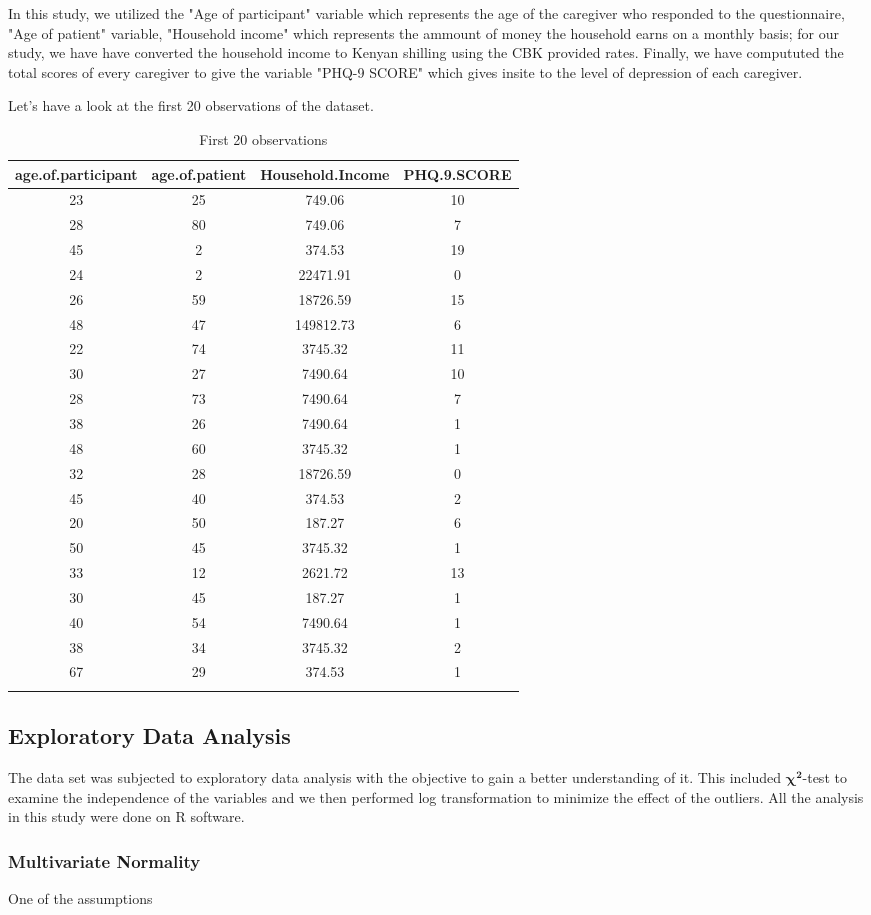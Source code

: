 \documentclass[12pt]{article}
\numberwithin{equation}{section}
\numberwithin{table}{section}
\begin{document}
\noindent In this study, we utilized the "Age of participant" variable which represents the age of the caregiver who responded to the questionnaire, "Age of patient" variable, "Household income" which represents the ammount of money the household earns on a monthly basis; for our study, we have have converted the household income to Kenyan shilling using the CBK provided rates. Finally, we have  compututed the total scores of every caregiver to give the variable "PHQ-9 SCORE" which gives insite to the level of depression of each caregiver.

\noindent Let's have a look at the first 20 observations of the dataset.
		\begin{longtable}[t]{|c|c|c|c|}
	\hline
	age.of.participant & age.of.patient & Household.Income & PHQ.9.SCORE\\
	\hline
	23 & 25 & 749.06 & 10\\
	28 & 80 & 749.06 & 7\\
	45 & 2 & 374.53 & 19\\
	24 & 2 & 22471.91 & 0\\
	26 & 59 & 18726.59 & 15\\
	
	48 & 47 & 149812.73 & 6\\
	22 & 74 & 3745.32 & 11\\
	30 & 27 & 7490.64 & 10\\
	28 & 73 & 7490.64 & 7\\
	38 & 26 & 7490.64 & 1\\
	
	48 & 60 & 3745.32 & 1\\
	32 & 28 & 18726.59 & 0\\
	45 & 40 & 374.53 & 2\\
	20 & 50 & 187.27 & 6\\
	50 & 45 & 3745.32 & 1\\
	
	33 & 12 & 2621.72 & 13\\
	30 & 45 & 187.27 & 1\\
	40 & 54 & 7490.64 & 1\\
	38 & 34 & 3745.32 & 2\\
	67 & 29 & 374.53 & 1\\
\hline

\caption{\label{tab:table 1}First 20 observations}
\end{longtable}

\subsection{Exploratory Data Analysis}
The data set was subjected to exploratory data analysis with the objective to gain a better understanding of it. This included $\boldsymbol{\chi^2}$-test to examine the independence of the variables and we then performed log transformation to minimize the effect of the outliers. All the analysis in this study were done on R software.

\subsubsection{Multivariate Normality}

One of the assumptions 

	

\end{document}
